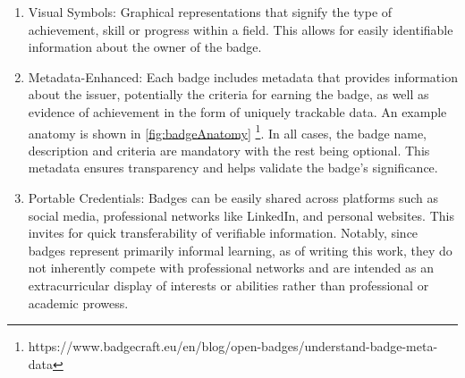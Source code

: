 \begin{enumerate}
  \addtolength{\itemsep}{-0.5\baselineskip} 
  \item Visual Symbols: Graphical representations that signify the type of achievement, skill or progress within a field. 
  This allows for easily identifiable information about the owner of the badge.
  \item Metadata-Enhanced: Each badge includes metadata that provides information about the issuer, potentially the criteria for earning the badge, as well as evidence of achievement in the form of uniquely trackable data. 
  An example anatomy is shown in \ref {fig:badgeAnatomy} \footnote{https://www.badgecraft.eu/en/blog/open-badges/understand-badge-meta-data}. 
  In all cases, the badge name, description and criteria are mandatory with the rest being optional.
  This metadata ensures transparency and helps validate the badge's significance.
  \item Portable Credentials: Badges can be easily shared across platforms such as social media, professional networks like LinkedIn, and personal websites. 
  This invites for quick transferability of verifiable information. 
  Notably, since badges represent primarily informal learning, as of writing this work, they do not inherently compete with professional networks and are intended as an extracurricular display of interests or abilities rather than professional or academic prowess.
\end{enumerate}

